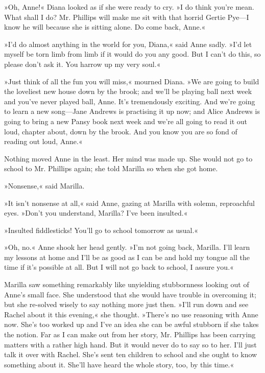 »Oh, Anne!« Diana looked as if she were ready to cry. »I do think you’re mean. What shall I do? Mr. Phillips will make me sit with that horrid Gertie Pye—I know he will because she is sitting alone. Do come back, Anne.«

»I’d do almost anything in the world for you, Diana,« said Anne sadly. »I’d let myself be torn limb from limb if it would do you any good. But I can’t do this, so please don’t ask it. You harrow up my very soul.«

»Just think of all the fun you will miss,« mourned Diana. »We are going to build the loveliest new house down by the brook; and we’ll be playing ball next week and you’ve never played ball, Anne. It’s tremendously exciting. And we’re going to learn a new song—Jane Andrews is practising it up now; and Alice Andrews is going to bring a new Pansy book next week and we’re all going to read it out loud, chapter about, down by the brook. And you know you are so fond of reading out loud, Anne.«

Nothing moved Anne in the least. Her mind was made up. She would not go to school to Mr. Phillips again; she told Marilla so when she got home.

»Nonsense,« said Marilla.

»It isn’t nonsense at all,« said Anne, gazing at Marilla with solemn, reproachful eyes. »Don’t you understand, Marilla? I’ve been insulted.«

»Insulted fiddlesticks! You’ll go to school tomorrow as usual.«

»Oh, no.« Anne shook her head gently. »I’m not going back, Marilla. I’ll learn my lessons at home and I’ll be as good as I can be and hold my tongue all the time if it’s possible at all. But I will not go back to school, I assure you.«

Marilla saw something remarkably like unyielding stubbornness looking out of Anne’s small face. She understood that she would have trouble in overcoming it; but she re-solved wisely to say nothing more just then. »I’ll run down and see Rachel about it this evening,« she thought. »There’s no use reasoning with Anne now. She’s too worked up and I’ve an idea she can be awful stubborn if she takes the notion. Far as I can make out from her story, Mr. Phillips has been carrying matters with a rather high hand. But it would never do to say so to her. I’ll just talk it over with Rachel. She’s sent ten children to school and she ought to know something about it. She’ll have heard the whole story, too, by this time.«


